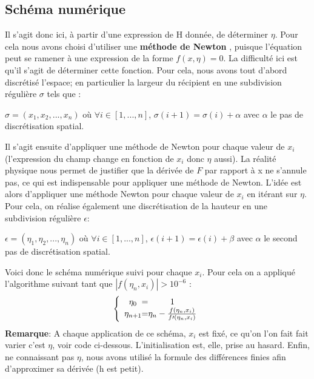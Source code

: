 \documentclass[10pt,a4paper]{article}
\begin{document}
\subsection{Schéma numérique}
Il s'agit donc ici, à partir d'une expression de H donnée, de déterminer $\eta$. Pour cela nous avons choisi d'utiliser une \textbf{méthode de Newton} \cite{newton} , puisque l'équation peut se ramener à une expression de la forme $f(x,\eta)=0$. La difficulté ici est qu'il s'agit de déterminer cette fonction. Pour cela, nous avons tout d'abord discrétisé l'espace; en particulier la largeur du récipient en une subdivision régulière $\sigma$ tels que :
\begin{center}
$\sigma=(x_1,x_2,...,x_n)$ où $\forall i \in [1,...,n]$,  $  \sigma(i+1)=\sigma(i)+\alpha$ avec $\alpha$ le pas de discrétisation spatial.
\end{center}
Il s'agit ensuite d'appliquer une méthode de Newton pour chaque valeur de $x_i$ (l'expression du champ change en fonction de $x_i$ donc $\eta$ aussi). La réalité physique nous permet de justifier que la dérivée de $F$ par rapport à x ne s'annule pas, ce qui est indispensable pour appliquer une méthode de Newton. L'idée est alors d'appliquer une méthode Newton pour chaque valeur de $x_i$ en itérant sur $\eta$. Pour cela, on réalise également une discrétisation de la hauteur en une subdivision régulière $\epsilon$:
\begin{center}
$\epsilon=(\eta_1,\eta_2,...,\eta_n)$ où $\forall i \in [1,...,n]$,  $  \epsilon(i+1)=\epsilon(i)+\beta$ avec $\alpha$ le second pas de discrétisation spatial.
\end{center}
Voici donc le schéma numérique suivi pour chaque $x_i$. Pour cela on a appliqué l'algorithme suivant tant que $|f(\eta_n,x_{i})| > 10^{-6}$ :
\newline 
\newline
\[
\left \{
\begin{array}{c @{=} c}
    \eta_{0} & 1  \\
    \eta_{n+1} & \eta_{n} - \frac{f(\eta_{n},x_{i})}{f\prime(\eta_{n},x_{i})}
\end{array}
\right.
\]
\textbf{Remarque}: A chaque application de ce schéma, $x_i$ est fixé, ce qu'on l'on fait fait varier c'est $\eta$, voir code ci-dessous. L'initialisation est, elle, prise au hasard.
\newline
\newline
Enfin, ne connaissant pas $\eta$, nous avons utilisé la formule des différences finies afin d'approximer sa dérivée (h est petit).
\end{document}
